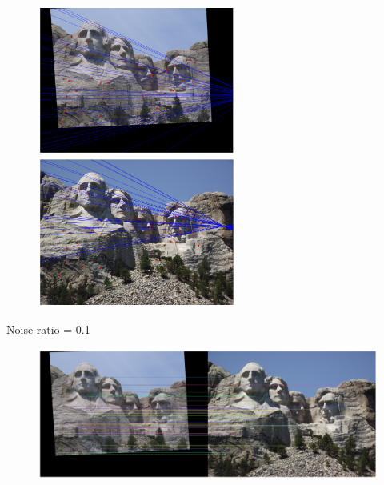 \documentclass[11pt]{article}
\begin{document}
\begin{figure}[H]
    \centering
    \includegraphics[width=6.5cm]{images/part3/ransac_image_1_noise_0.0_left.png}
    \includegraphics[width=6.5cm]{images/part3/ransac_image_1_noise_0.0_right.png}
\end{figure}

Noise ratio = 0.1
\begin{figure}[H]
    \centering
    \includegraphics[width=14cm]{images/part3/ransac_image_1_noise_0.1_1.png}
\end{figure}
\end{document}
